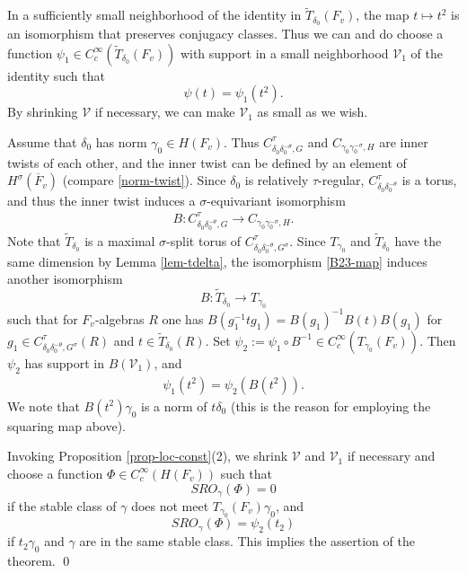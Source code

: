 \documentclass[12pt]{amsart}
\theoremstyle{remark}
\numberwithin{equation}{section}
\newcommand{\lto}{\longrightarrow}
\theoremstyle{definition}
\renewcommand{\bar}{\overline}
\numberwithin{equation}{subsection}
\begin{document}
In a sufficiently small neighborhood of the identity in $\widetilde{T}_{\delta_0}(F_v)$, the
 map $t \mapsto t^2$ is an isomorphism that preserves conjugacy classes.
Thus we can and do choose a function $\psi_1 \in
C_{c}^{\infty}(\widetilde{T}_{\delta_0}(F_v))$ with support in a small neighborhood
$\mathcal{V}_1$ of the identity such that
$$
\psi(t)=\psi_1(t^2).
$$
By shrinking $\mathcal{V}$ if necessary, we can make $\mathcal{V}_1$ as small as we wish.

Assume that $\delta_0$ has norm
$\gamma_0 \in H(F_v)$.  Thus $C_{\delta_0\delta_0^{-\theta},G}^{\tau}$ and $C_{\gamma_0\gamma_0^{-\sigma},H}$ are inner twists of each other, and the inner twist can be defined by an element of $H^{\sigma}(\bar{F}_v)$ (compare \eqref{norm-twist}).
Since $\delta_0$ is relatively $\tau$-regular,
$C_{\delta_0\delta_0^{-\theta}}^{\tau}$ is a torus, and thus the inner twist induces a $\sigma$-equivariant isomorphism
\begin{align} \label{B23-map}
B:C_{\delta_0\delta_0^{-\theta},G}^{\tau} \lto C_{\gamma_0\gamma_0^{-\sigma},H}.
\end{align}
Note that $\widetilde{T}_{\delta_0}$ is a maximal $\sigma$-split torus of $C_{\delta_0\delta_0^{-\theta},G^{\sigma}}^{\tau}$.
 Since $T_{\gamma_0}$ and $\widetilde{T}_{\delta_0}$ have the same dimension by
 Lemma \ref{lem-tdelta}, the isomorphism \eqref{B23-map} induces another isomorphism
$$
B:\widetilde{T}_{\delta_0} \lto T_{\gamma_0}
$$
such that for $F_v$-algebras $R$ one has $B(g_1^{-1}tg_1)=B(g_1)^{-1}B(t)B(g_1)$ for $g_1 \in C_{\delta_0\delta_0^{-\theta},G^{\sigma}}^{\tau}(R)$ and $t \in \widetilde{T}_{\delta_0}(R)$.
Set $\psi_2:=\psi_1\circ B^{-1} \in C_c^{\infty}(T_{\gamma_0}(F_v))$.  Then $\psi_2$ has
support in $B(\mathcal{V}_1)$, and
\begin{align} \label{sums-eq}
\psi_1(t^2)=\psi_2(B(t^2)).
\end{align}
We note that $B(t^2)\gamma_0$ is a norm of $t\delta_0$ (this is the reason for employing the
squaring map above).

Invoking Proposition \ref{prop-loc-const}(2),
we
shrink
 $\mathcal{V}$ and $\mathcal{V}_1$ if necessary and choose a function $\Phi \in
C_c^{\infty}(H(F_v))$ such that
$$
SRO_{\gamma}(\Phi)=0
$$
if the stable class of $\gamma$ does not meet $T_{\gamma_0}(F_v)\gamma_0$, and
$$
SRO_{\gamma}(\Phi)=\psi_2(t_2)
$$
if $t_2\gamma_0$ and $\gamma$ are in the same stable class.  This implies the assertion
 of the theorem. \qed
\end{document}
